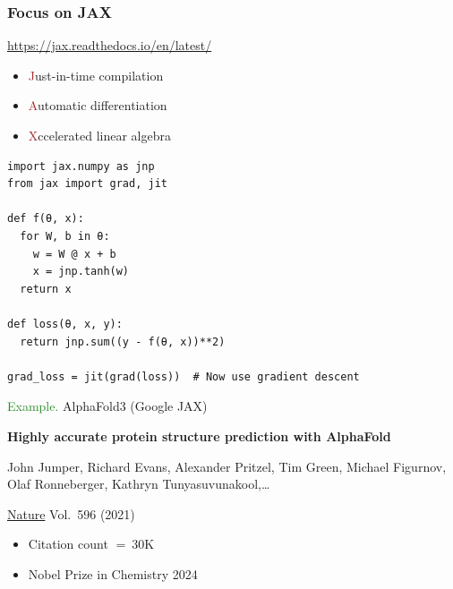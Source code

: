 \documentclass[
    xcolor={svgnames,dvipsnames},
    hyperref={colorlinks, citecolor=DeepPink4, linkcolor=DarkRed, urlcolor=DarkBlue}
    ]{beamer}  %
\newcommand{\Eg}{\textcolor{ForestGreen}{Example. }}
\newcommand{\brown}[1]{\textcolor{Brown}{\sf #1}}
\newcommand{\1}{\mathbbm 1}
\begin{document}
\begin{frame}
    \frametitle{Focus on JAX}

    \url{https://jax.readthedocs.io/en/latest/}
    
            \vspace{0.5em}
    \begin{itemize}
        \item \brown{J}ust-in-time compilation
            \vspace{0.5em}
        \item \brown{A}utomatic differentiation
            \vspace{0.5em}
        \item \brown{X}ccelerated linear algebra
    \end{itemize}

            \vspace{0.5em}
            \vspace{0.5em}

\end{frame}


\begin{frame}[fragile]
    
    \vspace{-1em}
    \begin{verbatim}
import jax.numpy as jnp
from jax import grad, jit

def f(θ, x):
  for W, b in θ:
    w = W @ x + b
    x = jnp.tanh(w)  
  return x

def loss(θ, x, y):
  return jnp.sum((y - f(θ, x))**2)

grad_loss = jit(grad(loss))  # Now use gradient descent 
    \end{verbatim}

\end{frame}


\begin{frame}
    
    \Eg AlphaFold3 (Google JAX)

        \vspace{0.5em}
    \textbf{Highly accurate protein structure prediction with AlphaFold}

        \vspace{0.5em}
    John Jumper, Richard Evans, Alexander Pritzel, Tim Green, Michael Figurnov,
    Olaf Ronneberger, Kathryn Tunyasuvunakool,\ldots 

        \vspace{0.5em}
    \underline{Nature} Vol.\ 596 (2021)

    \vspace{0.5em}
    \vspace{0.5em}
    \vspace{0.5em}
    \vspace{0.5em}
    \begin{itemize}
        \item Citation count $= ~30$K
        \vspace{0.5em}
        \item Nobel Prize in Chemistry 2024
    \end{itemize}

\end{frame}
\end{document}
